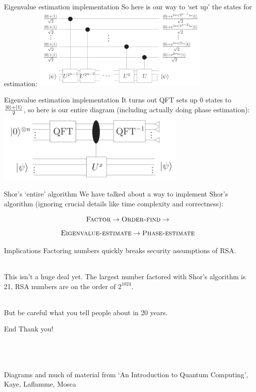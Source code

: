 \documentclass{beamer}
\begin{document}
\begin{frame}{Eigenvalue estimation implementation}
    So here is our way to `set up' the states for estimation:
    \centering \includegraphics[height=4cm]{eigenvalue-estimation.png}
\end{frame}
\begin{frame}{Eigenvalue estimation implementation}
    It turns out \textsc{QFT} sets up 0 states to $\frac{\ket{0} + \ket{1}}{2}$, so here is our entire diagram (including actually doing phase estimation):
    \centering \includegraphics[height=3.5cm]{eigenvalue-estimation-full.png}
\end{frame}

\begin{frame}{Shor's `entire' algorithm}
    We have talked about a way to implement Shor's algorithm (ignoring crucial details like time complexity and correctness):
    
    $$\textsc{Factor} \to \textsc{Order-find} \to$$
    $$\textsc{Eigenvalue-estimate} \to \textsc{Phase-estimate} $$
\end{frame}
\begin{frame}{Implications}
    Factoring numbers quickly breaks security assumptions of RSA. \pause
    
    \ \\
    
    This isn't a huge deal yet. The largest number factored with Shor's algorithm is 21, RSA numbers are on the order of $2^{1024}$. \pause
    
    \ \\
    
    But be careful what you tell people about in 20 years.
    
\end{frame}
\begin{frame}{End}
    Thank you!
    
    \ \\
    \ \\
    \ \\
    Diagrams and much of material from `An Introduction to Quantum Computing', Kaye, Laflamme, Mosca
\end{frame}
\end{document}
